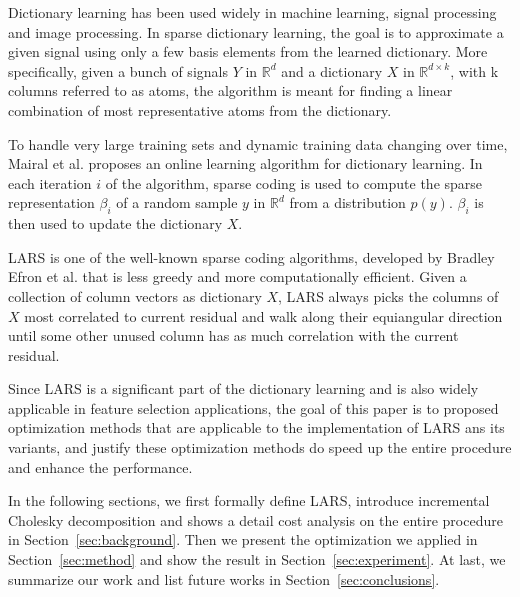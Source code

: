 

Dictionary learning has been used widely in machine learning, signal processing and image processing.
In sparse dictionary learning, the goal is to approximate a given signal using only a few basis elements from the learned dictionary. More specifically, given a bunch of signals $Y$ in $\mathbb{R}^d$ and a dictionary $X$ in $\mathbb{R}^{d \times k}$, with k columns referred to as atoms, the algorithm is meant for finding a linear combination of most representative atoms from the dictionary.

To handle very large training sets and dynamic training data changing over time, Mairal et al. proposes an online learning algorithm for dictionary learning\cite{Mairal:2010}. In each iteration $i$ of the algorithm, sparse coding is used to compute the sparse representation $\beta_i$ of a random sample $y$ in $\mathbb{R}^d$ from a distribution $p(y)$. $\beta_i$ is then used to update the dictionary $X$.

LARS is one of the well-known sparse coding algorithms, developed by Bradley Efron et al.\cite{Efron:04} that is less greedy and more computationally efficient. Given a collection of column vectors as dictionary $X$, LARS always picks the columns of $X$ most correlated to current residual and walk along their equiangular direction until some other unused column has as much correlation with the current residual.

Since LARS is a significant part of the dictionary learning and is also widely applicable in feature selection applications, the goal of this paper is to proposed optimization methods that are applicable to the implementation of LARS ans its variants, and justify these optimization methods do speed up the entire procedure and enhance the performance.

In the following sections, we first formally define LARS, introduce incremental Cholesky decomposition and shows a detail cost analysis on the entire procedure in Section~\ref{sec:background}.
Then we present the optimization we applied in Section~\ref{sec:method} and show the result in Section~\ref{sec:experiment}. At last, we summarize our work and list future works in Section~\ref{sec:conclusions}.






